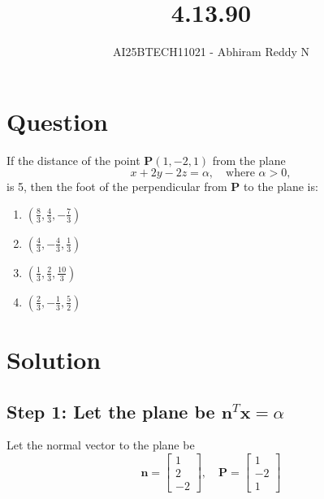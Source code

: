 \documentclass[journal]{IEEEtran}
\begin{document}

\vspace{3cm}

\title{4.13.90}
\author{AI25BTECH11021 - Abhiram Reddy N}
{\let\newpage\relax\maketitle}

\renewcommand{\thefigure}{\theenumi}
\renewcommand{\thetable}{\theenumi}
\setlength{\intextsep}{10pt} %


\renewcommand{\thetable}{\theenumi}


\section*{Question}
If the distance of the point \( \mathbf{P}(1, -2, 1) \) from the plane 
\[
x + 2y - 2z = \alpha, \quad \text{where } \alpha > 0,
\]
is 5, then the foot of the perpendicular from \( \mathbf{P} \) to the plane is:

\begin{multicols}{4}
\begin{enumerate}
    \item \( \left( \frac{8}{3}, \frac{4}{3}, -\frac{7}{3} \right) \)
    \item \( \left( \frac{4}{3}, -\frac{4}{3}, \frac{1}{3} \right) \)
    \item \( \left( \frac{1}{3}, \frac{2}{3}, \frac{10}{3} \right) \)
    \item \( \left( \frac{2}{3}, -\frac{1}{3}, \frac{5}{2} \right) \)
\end{enumerate}
\end{multicols}

\section*{Solution}

\subsection*{Step 1: Let the plane be \( \mathbf{n}^T \mathbf{x} = \alpha \)}

Let the normal vector to the plane be
\[
\mathbf{n} = \begin{bmatrix} 1 \\ 2 \\ -2 \end{bmatrix}, \quad \mathbf{P} = \begin{bmatrix} 1 \\ -2 \\ 1 \end{bmatrix}
\]
\end{document}
